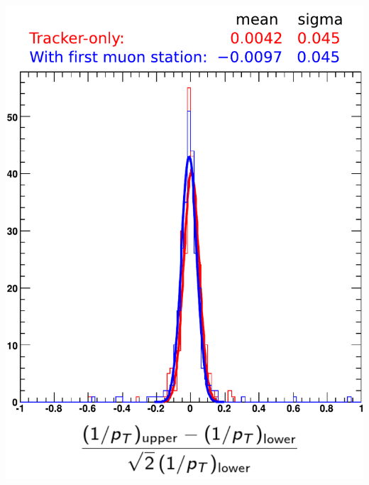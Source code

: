 \documentclass[compress]{beamer}
\begin{document}
\begin{frame}
\begin{columns}
\begin{center}
\includegraphics[width=0.9\linewidth]{with_alignment.pdf}
\end{center}
\end{columns}
\end{frame}
\end{document}
